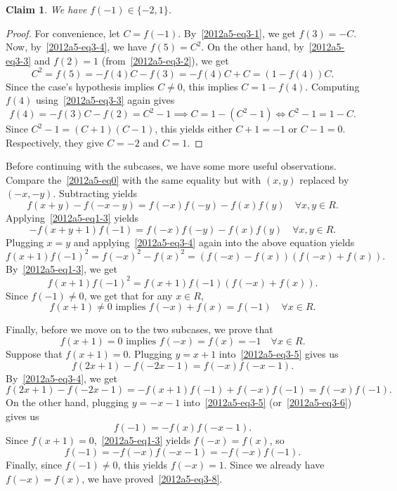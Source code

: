 \documentclass{article}
\newtheorem*{claim}{Claim}
\begin{document}
\begin{claim}
We have $f(-1) \in \{-2, 1\}$.
\end{claim}
\begin{proof}
For convenience, let $C = f(-1)$.
By~\eqref{2012a5-eq3-1}, we get $f(3) = -C$.
Now, by~\eqref{2012a5-eq3-4}, we have $f(5) = C^2$.
On the other hand, by~\eqref{2012a5-eq3-3} and $f(2) = 1$ (from~\eqref{2012a5-eq3-2}), we get
\[ C^2 = f(5) = -f(4) C - f(3) = -f(4) C + C = (1 - f(4)) C. \]
Since the case's hypothesis implies $C \neq 0$, this implies $C = 1 - f(4)$.
Computing $f(4)$ using~\eqref{2012a5-eq3-3} again gives
\[ f(4) = -f(3) C - f(2) = C^2 - 1 \implies C = 1 - (C^2 - 1) \iff C^2 - 1 = 1 - C. \]
Since $C^2 - 1 = (C + 1)(C - 1)$, this yields either $C + 1 = -1$ or $C - 1 = 0$.
Respectively, they give $C = -2$ and $C = 1$.
\end{proof}

Before continuing with the subcases, we have some more useful observations.
Compare the~\eqref{2012a5-eq0} with the same equality but with $(x, y)$ replaced by $(-x, -y)$.
Subtracting yields
\[ f(x + y) - f(-x - y) = f(-x) f(-y) - f(x) f(y) \quad \forall x, y \in R. \tag{3.5}\label{2012a5-eq3-5} \]
Applying~\eqref{2012a5-eq1-3} yields
\[ -f(x + y + 1) f(-1) = f(-x) f(-y) - f(x) f(y) \quad \forall x, y \in R. \tag{3.6}\label{2012a5-eq3-6} \]
Plugging $x = y$ and applying~\eqref{2012a5-eq3-4} again into the above equation yields
\[ f(x + 1) f(-1)^2 = f(-x)^2 - f(x)^2 = (f(-x) - f(x)) (f(-x) + f(x)). \]
By~\eqref{2012a5-eq1-3}, we get
\[ f(x + 1) f(-1)^2 = f(x + 1) f(-1) (f(-x) + f(x)). \]
Since $f(-1) \neq 0$, we get that for any $x \in R$,
\[ f(x + 1) \neq 0 \text{ implies } f(-x) + f(x) = f(-1) \quad \forall x \in R. \tag{3.7}\label{2012a5-eq3-7} \]

Finally, before we move on to the two subcases, we prove that
\[ f(x + 1) = 0 \text{ implies } f(-x) = f(x) = -1 \quad \forall x \in R. \tag{3.8}\label{2012a5-eq3-8} \]
Suppose that $f(x + 1) = 0$.
Plugging $y = x + 1$ into~\eqref{2012a5-eq3-5} gives us
\[ f(2x + 1) - f(-2x - 1) = f(-x) f(-x - 1). \]
By~\eqref{2012a5-eq3-4}, we get
\[ f(2x + 1) - f(-2x - 1) = -f(x + 1) f(-1) + f(-x) f(-1) = f(-x) f(-1). \]
On the other hand, plugging $y = -x - 1$ into~\eqref{2012a5-eq3-5} (or~\eqref{2012a5-eq3-6}) gives us
\[ f(-1) = -f(x) f(-x - 1). \]
Since $f(x + 1) = 0$,~\eqref{2012a5-eq1-3} yields $f(-x) = f(x)$, so
\[ f(-1) = -f(-x) f(-x - 1) = -f(-x) f(-1). \]
Finally, since $f(-1) \neq 0$, this yields $f(-x) = 1$.
Since we already have $f(-x) = f(x)$, we have proved~\eqref{2012a5-eq3-8}.
\end{document}
